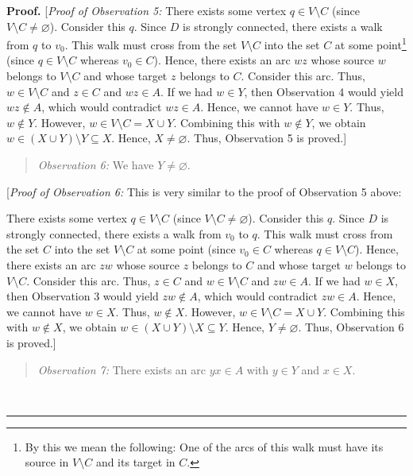 \documentclass[numbers=enddot,12pt,final,onecolumn,notitlepage]{scrartcl}%
\numberwithin{exer}{subsection}
\theoremstyle{definition}
\newenvironment{statement}{\begin{quote}}{\end{quote}}
\newenvironment{proof}[1][Proof]{\noindent\textbf{#1.} }{\ \rule{0.5em}{0.5em}}
\begin{document}
\begin{proof}
[\textit{Proof of Observation 5:} There exists some vertex $q\in V\setminus C$
(since $V\setminus C\neq\varnothing$). Consider this $q$. Since $D$ is
strongly connected, there exists a walk from $q$ to $v_{0}$. This walk must
cross from the set $V\setminus C$ into the set $C$ at some point\footnote{By
this we mean the following: One of the arcs of this walk must have its source
in $V\setminus C$ and its target in $C$.} (since $q\in V\setminus C$ whereas
$v_{0}\in C$). Hence, there exists an arc $wz$ whose source $w$ belongs to
$V\setminus C$ and whose target $z$ belongs to $C$. Consider this arc. Thus,
$w\in V\setminus C$ and $z\in C$ and $wz\in A$. If we had $w\in Y$, then
Observation 4 would yield $wz\notin A$, which would contradict $wz\in A$.
Hence, we cannot have $w\in Y$. Thus, $w\notin Y$. However, $w\in V\setminus
C=X\cup Y$. Combining this with $w\notin Y$, we obtain $w\in\left(  X\cup
Y\right)  \setminus Y\subseteq X$. Hence, $X\neq\varnothing$. Thus,
Observation 5 is proved.]

\begin{statement}
\textit{Observation 6:} We have $Y\neq\varnothing$.
\end{statement}

[\textit{Proof of Observation 6:} This is very similar to the proof of
Observation 5 above:

There exists some vertex $q\in V\setminus C$ (since $V\setminus C\neq
\varnothing$). Consider this $q$. Since $D$ is strongly connected, there
exists a walk from $v_{0}$ to $q$. This walk must cross from the set $C$ into
the set $V\setminus C$ at some point (since $v_{0}\in C$ whereas $q\in
V\setminus C$). Hence, there exists an arc $zw$ whose source $z$ belongs to
$C$ and whose target $w$ belongs to $V\setminus C$. Consider this arc. Thus,
$z\in C$ and $w\in V\setminus C$ and $zw\in A$. If we had $w\in X$, then
Observation 3 would yield $zw\notin A$, which would contradict $zw\in A$.
Hence, we cannot have $w\in X$. Thus, $w\notin X$. However, $w\in V\setminus
C=X\cup Y$. Combining this with $w\notin X$, we obtain $w\in\left(  X\cup
Y\right)  \setminus X\subseteq Y$. Hence, $Y\neq\varnothing$. Thus,
Observation 6 is proved.]

\begin{statement}
\textit{Observation 7:} There exists an arc $yx\in A$ with $y\in Y$ and $x\in
X$.
\end{statement}


\end{proof}
\end{document}
